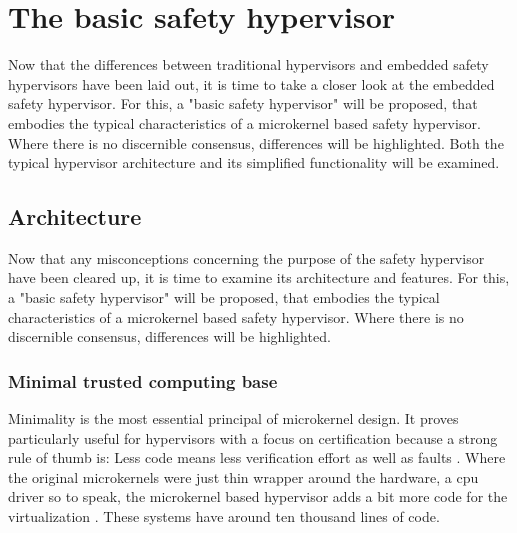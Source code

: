 
\chapter{The basic safety hypervisor} %

\label{Chapter2} %





Now that the differences between traditional hypervisors and embedded safety hypervisors have been laid out, it is time to take a closer look at the embedded safety hypervisor.
For this, a "basic safety hypervisor" will be proposed, that embodies the typical characteristics of a microkernel based safety hypervisor. Where there is no discernible consensus, differences will be highlighted. Both the typical hypervisor architecture and its simplified functionality will be examined.

\section{Architecture}

Now that any misconceptions concerning the purpose of the safety hypervisor have been cleared up, it is time to examine its architecture and features. For this, a "basic safety hypervisor" will be proposed, that embodies the typical characteristics of a microkernel based safety hypervisor. Where there is no discernible consensus, differences will be highlighted.

\subsection{Minimal trusted computing base}
Minimality is the most essential principal of microkernel design. It proves particularly useful for hypervisors with a focus on certification because a strong rule of thumb is: Less code means less verification effort as well as faults \cite{Lipow.1982}.  
Where the original microkernels were just thin wrapper around the hardware, a \acrshort{cpu} driver so to speak, the microkernel based hypervisor adds a bit more code for the virtualization \cite{Heiser.2010}. These systems have around ten thousand lines of code.


